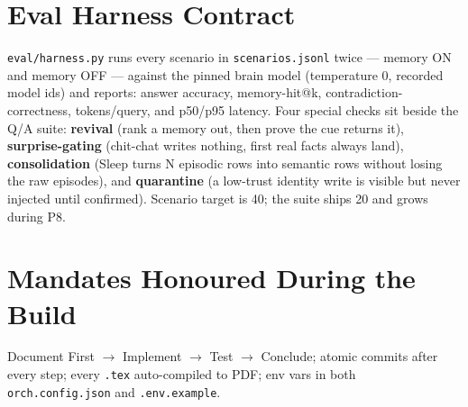 \section{Eval Harness Contract}
\texttt{eval/harness.py} runs every scenario in \texttt{scenarios.jsonl} twice --- memory ON and
memory OFF --- against the pinned brain model (temperature 0, recorded model ids) and reports:
answer accuracy, memory-hit@k, contradiction-correctness, tokens/query, and p50/p95 latency.
Four special checks sit beside the Q/A suite: \textbf{revival} (rank a memory out, then prove the
cue returns it), \textbf{surprise-gating} (chit-chat writes nothing, first real facts always
land), \textbf{consolidation} (Sleep turns N episodic rows into semantic rows without losing the
raw episodes), and \textbf{quarantine} (a low-trust identity write is visible but never injected
until confirmed). Scenario target is 40; the suite ships 20 and grows during P8.

\section{Mandates Honoured During the Build}
Document First $\rightarrow$ Implement $\rightarrow$ Test $\rightarrow$ Conclude; atomic commits
after every step; every \texttt{.tex} auto-compiled to PDF; env vars in both \texttt{orch.config.json}
and \texttt{.env.example}.
